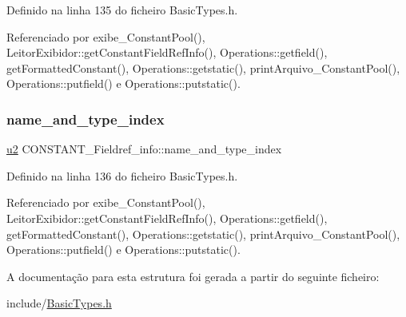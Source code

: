 Definido na linha 135 do ficheiro Basic\+Types.\+h.



Referenciado por exibe\+\_\+\+Constant\+Pool(), Leitor\+Exibidor\+::get\+Constant\+Field\+Ref\+Info(), Operations\+::getfield(), get\+Formatted\+Constant(), Operations\+::getstatic(), print\+Arquivo\+\_\+\+Constant\+Pool(), Operations\+::putfield() e Operations\+::putstatic().

\mbox{\label{structCONSTANT__Fieldref__info_a9ccfe931ed030cef53ca1b079356fe31}} 
\subsubsection{\texorpdfstring{name\+\_\+and\+\_\+type\+\_\+index}{name\_and\_type\_index}}
{\footnotesize\ttfamily \hyperlink{BasicTypes_8h_a732cde1300aafb73b0ea6c2558a7a54f}{u2} C\+O\+N\+S\+T\+A\+N\+T\+\_\+\+Fieldref\+\_\+info\+::name\+\_\+and\+\_\+type\+\_\+index}



Definido na linha 136 do ficheiro Basic\+Types.\+h.



Referenciado por exibe\+\_\+\+Constant\+Pool(), Leitor\+Exibidor\+::get\+Constant\+Field\+Ref\+Info(), Operations\+::getfield(), get\+Formatted\+Constant(), Operations\+::getstatic(), print\+Arquivo\+\_\+\+Constant\+Pool(), Operations\+::putfield() e Operations\+::putstatic().



A documentação para esta estrutura foi gerada a partir do seguinte ficheiro\+:\begin{DoxyCompactItemize}
\item 
include/\hyperlink{BasicTypes_8h}{Basic\+Types.\+h}\end{DoxyCompactItemize}
